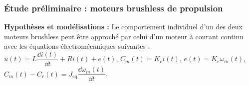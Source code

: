 \begin{multicols}{2}
\begin{multicols}{2}
\subsubsection*{Étude préliminaire : moteurs brushless de propulsion}
\noindent\textbf{Hypothèses et modélisations :}
Le comportement individuel d’un des deux moteurs brushless peut être approché par celui d’un
moteur à courant continu avec les équations électromécaniques suivantes :
$u(t)=L\dfrac{\dd i(t)}{\dd t}+Ri(t)+e(t)$, 
$C_m(t)=K_ci(t)$, 
$e(t)=K_e\omega_m(t)$, 
$C_m(t)-C_r(t)=J_{\text{eq}}\dfrac{\dd \omega_m(t)}{\dd t}$.


\end{multicols}
\end{multicols}
